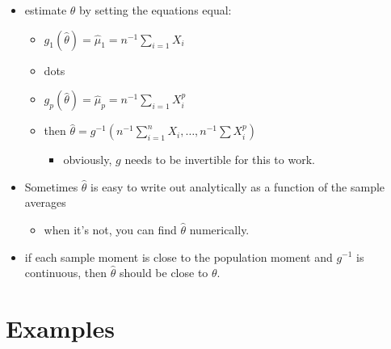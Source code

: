 \begin{itemize}
\begin{itemize}
\end{itemize}
\item estimate $\theta$ by setting the equations equal:
\begin{itemize}
\item $g_1(\hat\theta) = \hat\mu_1 = n^{-1}\sum_{i=1} X_i$
\item dots
\item $g_p(\hat\theta) = \hat\mu_p = n^{-1}\sum_{i=1} X_i^p$
\item then $\hat\theta = g^{-1}(n^{-1}\sum_{i=1}^n
        X_i,\dots,n^{-1}\sum X_i^p)$
\begin{itemize}
\item obviously, $g$ needs to be invertible for this to work.
\end{itemize}
\end{itemize}
\item Sometimes $\hat\theta$ is easy to write out analytically as a
      function of the sample averages
\begin{itemize}
\item when it's not, you can find $\hat \theta$ numerically.
\end{itemize}
\item if each sample moment is close to the population moment and
      $g^{-1}$ is continuous, then $\hat\theta$ should be close to $\theta$.
\end{itemize}

\section{Examples}

